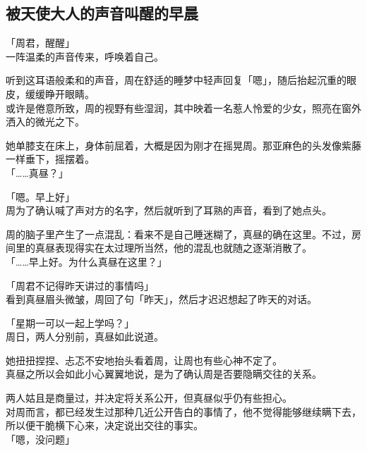 \subsection{被天使大人的声音叫醒的早晨}

「周君，醒醒」\\

一阵温柔的声音传来，呼唤着自己。

听到这耳语般柔和的声音，周在舒适的睡梦中轻声回复「嗯」，随后抬起沉重的眼皮，缓缓睁开眼睛。\\

或许是倦意所致，周的视野有些湿润，其中映着一名惹人怜爱的少女，照亮在窗外洒入的微光之下。

她单膝支在床上，身体前屈着，大概是因为刚才在摇晃周。那亚麻色的头发像紫藤一样垂下，摇摆着。\\

「……真昼？」

「嗯。早上好」\\

周为了确认喊了声对方的名字，然后就听到了耳熟的声音，看到了她点头。

周的脑子里产生了一点混乱：看来不是自己睡迷糊了，真昼的确在这里。不过，房间里的真昼表现得实在太过理所当然，他的混乱也就随之逐渐消散了。\\

「……早上好。为什么真昼在这里？」

「周君不记得昨天讲过的事情吗」\\

看到真昼眉头微皱，周回了句「昨天」，然后才迟迟想起了昨天的对话。\\

\vspace{2\baselineskip}

「星期一可以一起上学吗？」\\

周日，两人分别前，真昼如此说道。

她扭扭捏捏、忐忑不安地抬头看着周，让周也有些心神不定了。\\

真昼之所以会如此小心翼翼地说，是为了确认周是否要隐瞒交往的关系。

两人姑且是商量过，并决定将关系公开，但真昼似乎仍有些担心。\\

对周而言，都已经发生过那种几近公开告白的事情了，他不觉得能够继续瞒下去，所以便干脆横下心来，决定说出交往的事实。\\

「嗯，没问题」

